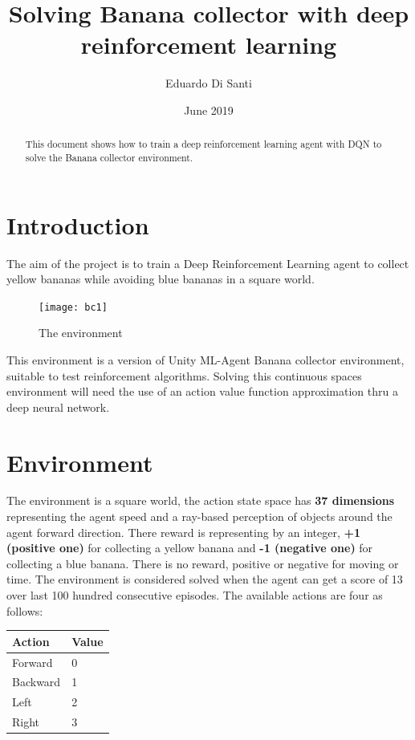 \documentclass{article}
\author{Eduardo Di Santi }
\date{June 2019}
\title{Solving Banana collector with deep reinforcement learning}
\begin{document}
\maketitle
\begin{abstract}
This document shows how to train a deep reinforcement learning agent with DQN to solve the Banana collector environment.
\end{abstract}

\section{Introduction}
The aim of the project is to train a Deep Reinforcement Learning agent to collect yellow bananas while avoiding blue bananas in a square world.

\begin{figure}[!htbp]
\centering
\texttt{[image: bc1]}
\caption{The environment}
\label{fig:bc1}
\end{figure}
This environment is a version of Unity ML-Agent Banana collector environment, suitable to test reinforcement algorithms. Solving this continuous spaces environment will need the use of an action value function approximation thru a deep neural network. 

\section{Environment}

The environment is a square world, the action state space has \textbf{37 dimensions} representing the agent speed and a ray-based\cite{ray-based} perception of objects around the agent forward direction.\newline
There reward is representing by an integer, \textbf{+1 (positive one)} for collecting a yellow banana and \textbf{-1 (negative one)} for collecting a blue banana.\newline
There is no reward, positive or negative for moving or time.\newline
The environment is considered solved when the agent can get a score of 13 over last 100 hundred consecutive episodes.\newline
The available actions are four as follows:
\begin{table}[!htbp]
\center
\begin{tabular}{l|l}
Action         & Value\\
\hline
Forward &     0   \\
Backward      & 1 \\
Left 	      & 2 \\
Right 	      & 3 	
\end{tabular}
\end{table}
\end{document}
